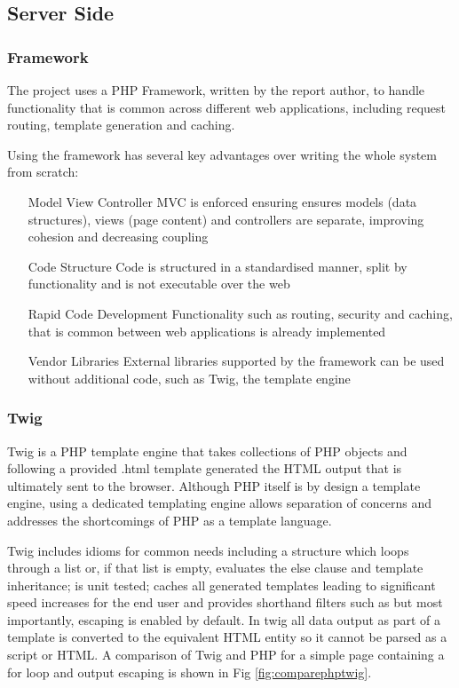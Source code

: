 \subsection{Server Side}
\subsubsection{Framework}
The project uses a PHP Framework, written by the report author, to handle functionality that is common across different web applications, including request routing, template generation and caching.

Using the framework has several key advantages over writing the whole system from scratch:

\begin{itemize}
\item[Model View Controller] MVC is enforced ensuring ensures models (data structures), views (page content) and controllers are separate, improving cohesion and decreasing coupling
\item[Code Structure] Code is structured in a standardised manner, split by functionality and is not executable over the web
\item[Rapid Code Development] Functionality such as routing, security and caching, that is common between web applications is already implemented
\item[Vendor Libraries] External libraries supported by the framework can be used without additional code, such as Twig, the template engine
\end{itemize}

\subsubsection{Twig}
Twig is a PHP template engine that takes collections of PHP objects and following a provided .html template generated the HTML output that is ultimately sent to the browser. Although PHP itself is by design a template engine, using a dedicated templating engine allows separation of concerns and addresses the shortcomings of PHP as a template language.

Twig includes idioms for common needs including a  structure which loops through a list or, if that list is empty, evaluates the else clause and template inheritance; is unit tested; caches all generated templates leading to significant speed increases for the end user and provides shorthand filters such as  but most importantly, escaping is enabled by default. In twig all data output as part of a template is converted to the equivalent HTML entity so it cannot be parsed as a script or HTML.
% 
A comparison of Twig and PHP for a simple page containing a for loop and output escaping is shown in Fig \ref{fig:comparephptwig}.

